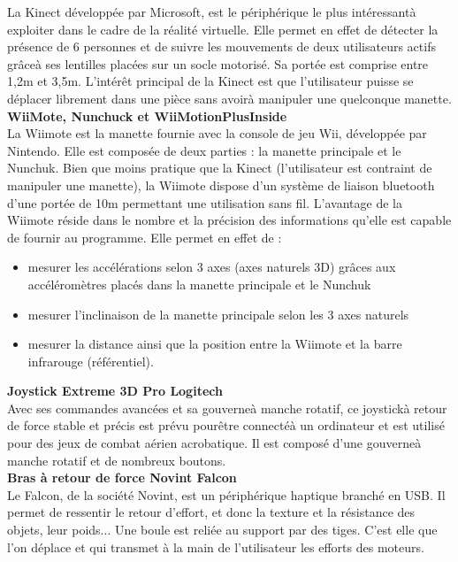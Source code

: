 La Kinect développée par Microsoft, est le périphérique le plus intéressantà exploiter dans le cadre de la réalité virtuelle. Elle permet en effet de détecter la présence de 6 personnes et de suivre les mouvements de deux utilisateurs actifs grâceà ses lentilles placées sur un socle motorisé. Sa portée est comprise entre 1,2m et 3,5m. L'intérêt principal de la Kinect est que l'utilisateur puisse se déplacer librement dans une pièce sans avoirà manipuler une quelconque manette.
\\

\textbf{WiiMote, Nunchuck et WiiMotionPlusInside}
\\

La Wiimote est la manette fournie avec la console de jeu Wii, développée par Nintendo. Elle est composée de deux parties : la manette principale et le Nunchuk. Bien que moins pratique que la Kinect (l'utilisateur est contraint de manipuler une manette), la Wiimote dispose d'un système de liaison bluetooth d'une portée de 10m permettant une utilisation sans fil. L'avantage de la Wiimote réside dans le nombre et la précision des informations qu'elle est capable de fournir au programme. 
\newline
Elle permet en effet de :
\begin{itemize}
  \item mesurer les accélérations selon 3 axes (axes naturels 3D) grâces aux accéléromètres placés dans la manette principale et le Nunchuk
  \item mesurer l'inclinaison de la manette principale selon les 3 axes naturels
  \item mesurer la distance ainsi que la position entre la Wiimote et la barre infrarouge (référentiel).
\end{itemize}

\textbf{Joystick Extreme 3D Pro Logitech}
\\

Avec ses commandes avancées et sa gouverneà manche rotatif, ce joystickà retour de force stable et précis est prévu pourêtre connectéà un ordinateur et est utilisé pour des jeux de combat aérien acrobatique. Il est composé d'une gouverneà manche rotatif et de nombreux boutons.
\\

\textbf{Bras à retour de force Novint Falcon}
\\

Le Falcon, de la société Novint, est un périphérique haptique branché en USB. Il permet de ressentir le retour d'effort, et donc la texture et la résistance des objets, leur poids... Une boule est reliée au support par des tiges. C'est elle que l'on déplace et qui transmet à la main de l'utilisateur les efforts des moteurs.
\\

